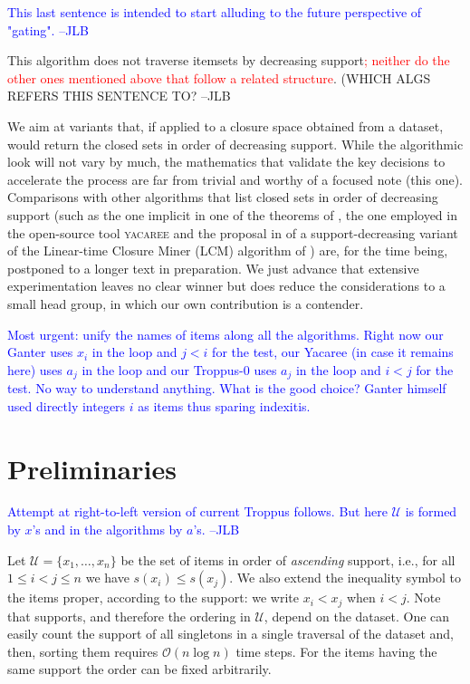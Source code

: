 \documentclass{article}
\newcommand{\added}[1]{\textcolor{blue}{#1}}
\newcommand{\deleted}[1]{\textcolor{red}{#1}}
\def\U{\mathcal{U}}
\def\s{\mathit{s}}
\begin{document}
{\added{This last sentence is intended to start alluding to
the future perspective of "gating". --JLB}


This algorithm
does not traverse itemsets by decreasing support\deleted{; neither 
do the other ones mentioned above that follow a
related structure}. (WHICH ALGS REFERS THIS SENTENCE TO? --JLB


}


We aim at variants that, if applied to a closure space 
obtained from a dataset, would return the closed sets in
order of decreasing support. While the algorithmic look
will not vary by much, the mathematics that validate the
key decisions to accelerate the process are far from 
trivial and worthy of a focused note (this one).
Comparisons with other algorithms
that list closed sets in order of decreasing support (such as
the one implicit in one of the theorems of \cite{boros2003maximal},
the one employed in the open-source tool \textsc{yacaree}
and the proposal in \cite{pietracaprina2007efficient} of a
support-decreasing variant of the Linear-time Closure Miner (LCM) 
algorithm of \cite{UAUA04}) are, for the time being, postponed 
to a longer text in preparation. We just advance that extensive
experimentation leaves no clear winner but does reduce the 
considerations to a small head group, in which our own contribution 
is a contender.

\added{Most urgent: unify the names of items along all the algorithms.
Right now our Ganter uses $x_i$ in the loop and $j < i$ for the test,
our Yacaree (in case it remains here) uses $a_j$ in the loop and 
our Troppus-0 uses $a_j$ in the loop and $i < j$ for the test. 
No way to understand anything.
What is the good choice? Ganter himself used directly integers $i$
as items thus sparing indexitis.}

\section{Preliminaries}\label{sec:Prel}

\added{Attempt at right-to-left version of current Troppus follows. 
But here $\U$ is formed by $x$'s and in the algorithms by $a$'s. --JLB}

Let $\U=\{x_1,\ldots,x_n\}$ be the set of items in order of 
\emph{ascending} support, i.e., 
for all $1 \leq i < j \leq n$ we have $\s(x_i) \leq \s(x_j)$. 
We also extend the inequality symbol to the items proper,
according to the support: we write $x_i < x_j$ when $i < j$.
Note that supports, and therefore the ordering in $\U$, depend 
on the dataset. One can easily count the support of all singletons 
in a single traversal of the dataset and, then, sorting them requires 
$\mathcal{O}(n \log n)$ time steps. For the items having the same 
support the order can be fixed arbitrarily. 
\end{document}
